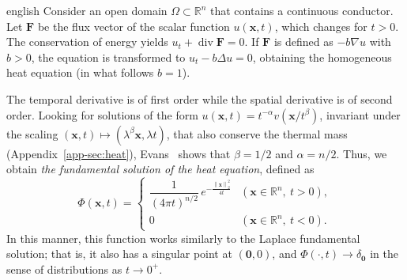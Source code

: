 \documentclass[12pt,letterpaper,twoside]{book}
\newcommand{\norm}[1]{\left\lVert #1 \right\rVert}
\begin{document}
\begin{hyphenrules}{english}
Consider an open domain $\Omega\subset\mathbb{R}^n$ that contains a continuous conductor. Let $\mathbf{F}$ be the flux
vector of the scalar function $u(\mathbf{x},t)$, which changes for $t>0$. The conservation of energy yields
$u_t+\operatorname{div}\mathbf{F}=0$. If $\mathbf{F}$ is defined as $-b\nabla u$ with $b>0$, the equation is transformed
to $u_t-b\Delta u=0$, obtaining the homogeneous heat equation (in what follows $b=1$).

The temporal derivative is of first order while the spatial derivative is of second order. Looking for
solutions of the form $u(\mathbf{x},t)=t^{-\alpha}v(\mathbf{x}/t^{\beta})$, invariant under the scaling
$(\mathbf{x},t)\mapsto(\lambda^{\beta}\mathbf{x},\lambda t)$, that also conserve the thermal mass
(Appendix~\ref{app-sec:heat}), Evans~\cite{evans2010} shows that $\beta=1/2$ and $\alpha=n/2$. Thus, we obtain
\emph{the fundamental solution of the heat equation}, defined as
\begin{equation}
  \Phi(\mathbf{x},t)=
  \begin{cases}
    \dfrac{1}{(4\pi t)^{n/2}}\,e^{-\frac{\norm{\mathbf{x}}_2^2}{4t}} & (\mathbf{x}\in\mathbb{R}^n,\ t>0),\\[2mm]
    0 & (\mathbf{x}\in\mathbb{R}^n,\ t<0).
  \end{cases}
  \label{eq:heat-fundamental}
\end{equation}
In this manner, this function works similarly to the Laplace fundamental solution; that is, it also has
a singular point at $(\mathbf{0},0)$, and $\Phi(\cdot,t)\to\delta_{\mathbf{0}}$ in the sense of
distributions as $t\to0^+$.


\end{hyphenrules}
\end{document}
